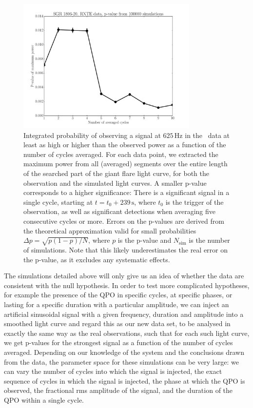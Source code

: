 \documentclass{emulateapj}
\begin{document}
\begin{figure}[htbp]
\begin{center}
\includegraphics[width=9cm]{f5.pdf}
\caption{Integrated probability of observing a signal at $625 \, \mathrm{Hz}$ in the \rxte\ data at least as high or higher than the observed power as a function of the number of cycles averaged. For each data point, we extracted the maximum power from all (averaged) segments over the entire length of the searched part of the giant flare light curve, for both the observation and the simulated light curves. A smaller p-value corresponds to a higher significance: There is a significant signal in a single cycle, starting at $t = t_0 + 239 \, \mathrm{s}$, where $t_0$ is the trigger of the observation, as well as significant detections when averaging five consecutive cycles or more. Errors on the p-values are derived from the theoretical approximation valid for small probabilities $\Delta p = \sqrt{p (1-p)/N}$, where $p$ is the p-value and $N_\mathrm{sim}$ is the number of simulations. Note that this likely underestimates the real error on the p-value, as it excludes any systematic effects.}
\label{fig:rxte_pvals}
\end{center}
\end{figure}



The simulations detailed above will only give us an idea of whether the data are consistent with the null hypothesis. In order to test more complicated hypotheses, for example the presence of the QPO in specific cycles, at specific phases, or lasting for a specific duration with a particular amplitude, we can inject an artificial sinusoidal signal with a given frequency, duration and amplitude into a smoothed light curve and regard this as our new data set, to be analysed in exactly the same way as the real observations, such that for each such light curve, we get p-values for the strongest signal as a function of the number of cycles averaged. Depending on our knowledge of the system and the conclusions drawn from the data, the parameter space for these simulations can be very large: we can vary the number of cycles into which the signal is injected, the exact sequence of cycles in which the signal is injected, the phase at which the QPO is observed, the fractional rms amplitude of the signal, and the duration of the QPO within a single cycle.
\end{document}
